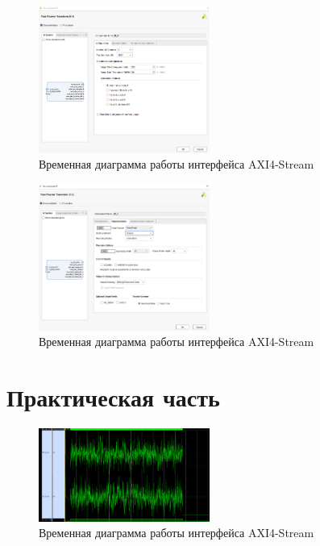 \begin{figure}[h]
	\centering
	\includegraphics[width=0.5\textwidth]{image/fft_config.png}
	\caption{Временная диаграмма работы интерфейса AXI4-Stream}
	\label{fft_config}
\end{figure}
	
\begin{figure}[h]
	\centering
	\includegraphics[width=0.5\textwidth]{image/fft_implemetation.png}
	\caption{Временная диаграмма работы интерфейса AXI4-Stream}
	\label{fft_implemetation}
\end{figure}
	
\section{Практическая часть}

\begin{figure}[h]
	\centering
	\includegraphics[width=0.5\textwidth]{image/lfm_with_noise.png}
	\caption{Временная диаграмма работы интерфейса AXI4-Stream}
	\label{fft_result}
\end{figure}
	
